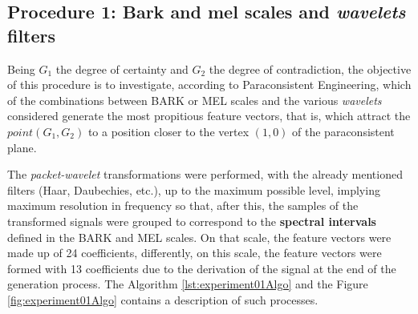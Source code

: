 		\subsection{Procedure 1: Bark and mel scales and \textit{wavelets} filters}
			\label{sec:propApproach:subsec:Experiment1}
			\par Being $G_1$ the degree of certainty and $G_2$ the degree of contradiction, the objective of this procedure is to investigate, according to Paraconsistent Engineering, which of the combinations between BARK or MEL scales and the various \textit{wavelets} considered generate the most propitious feature vectors, that is, which attract the $point(G_1, G_2)$ to a position closer to the vertex $(1,0)$ of the paraconsistent plane.
			
			\par The \textit{packet-wavelet} transformations were performed, with the already mentioned filters (Haar, Daubechies, etc.), up to the maximum possible level, implying maximum resolution in frequency so that, after this, the samples of the transformed signals were grouped to correspond to the \textbf{spectral intervals} defined in the BARK and MEL scales. On that scale, the feature vectors were made up of 24 coefficients, differently, on this scale, the feature vectors were formed with 13 coefficients due to the derivation of the signal at the end of the generation process. The Algorithm \ref{lst:experiment01Algo} and the Figure \ref{fig:experiment01Algo} contains a description of such processes.\\
			
			
			
